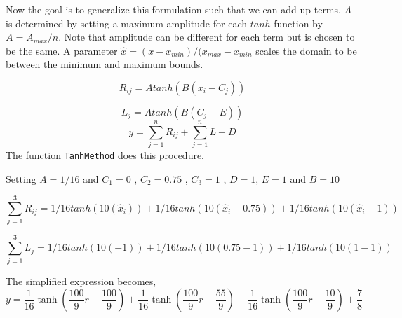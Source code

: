 Now the goal is to generalize this formulation such that we can add up terms.
$A$ is determined by setting a maximum amplitude for each $tanh$ function by
$A = A_{max}/n$. Note that amplitude can be different for each term but is chosen
to be the same. A parameter $\hat{x} = (x - x_{min})/ (x_{max} - x_{min}$ scales the domain to be between the  
minimum and maximum bounds.


\begin{equation}
    R_{ij} = A tanh(B(x_i-C_j)) 
    \label{eqn:1}
\end{equation}

\begin{equation}
    L_{j} = A tanh(B(C_j-E)) 
    \label{eqn:2}
\end{equation}
\begin{equation}
    y = \sum_{j = 1}^{n}  R_{ij} + \sum_{j = 1}^{n}L + D
    \label{eqn:3}
\end{equation}
The function \verb|TanhMethod| does this procedure. 

Setting $A = 1/16$ and $C_1  = 0$ , $C_2 = 0.75$ , $C_3 = 1$ , $D = 1$, $E = 1$  and 
$B = 10$


\begin{equation}
    \sum_{j = 1}^{3} R_{ij} = 1/16 tanh(10(\hat{x}_i))  + 1/16 tanh(10(\hat{x}_i-0.75)) + 1/16 tanh(10(\hat{x}_i-1))
    \label{eqn:1}
\end{equation}

\begin{equation}
    \sum_{j = 1}^{3} L_{j} = 1/16 tanh(10(-1))  + 1/16 tanh(10(0.75 - 1)) + 1/16 tanh(10(1-1))
    \label{eqn:1}
\end{equation}

The simplified expression becomes,
\begin{equation}
    y = \frac{1}{16}\tanh\left(\frac{100}{9}r - \frac{100}{9}\right) + \frac{1}{16}\tanh\left(\frac{100}{9}r -\frac{55}{9}\right) + \frac{1}{16}\tanh\left(\frac{100}{9}r -\frac{10}{9} \right) + \frac{7}{8}
\end{equation}


